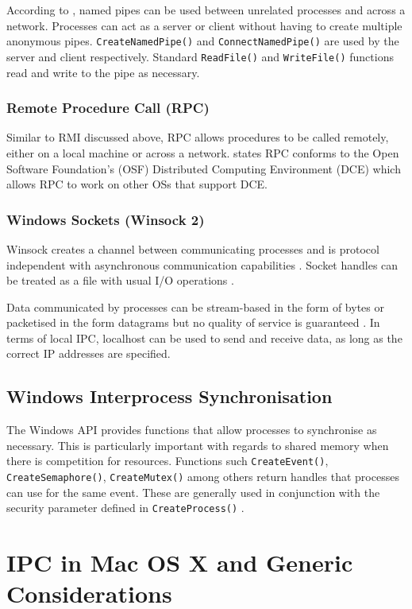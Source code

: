 \documentclass[12pt,a4paper,oneside]{article}
\def\code#1{\texttt{#1}}
\begin{document}
      According to \cite{MSDN_API}, named pipes can be used between unrelated processes and across a network. Processes can act as a server or client without having to create multiple anonymous pipes. \code{CreateNamedPipe()} and \code{ConnectNamedPipe()} are used by the server and client respectively. Standard \code{ReadFile()} and \code{WriteFile()} functions read and write to the pipe as necessary.

    \subsubsection{Remote Procedure Call (RPC)}
      Similar to RMI discussed above, RPC allows procedures to be called remotely, either on a local machine or across a network. \cite{MSDN_API} states RPC conforms to the Open Software Foundation's (OSF) Distributed Computing Environment (DCE) which allows RPC to work on other OSs that support DCE.

    \subsubsection{Windows Sockets (Winsock 2)}
      Winsock creates a channel between communicating processes and is protocol independent with asynchronous communication capabilities \citep{lewandowski1997interprocess}. Socket handles can be treated as a file with usual I/O operations \citep{MSDN_API}.

      Data communicated by processes can be stream-based in the form of bytes or packetised in the form datagrams but no quality of service is guaranteed \citep{IPCWindowsLinkedInSlides}. In terms of local IPC, localhost can be used to send and receive data, as long as the correct IP addresses are specified.

  \subsection{Windows Interprocess Synchronisation}
    The Windows API provides functions that allow processes to synchronise as necessary. This is particularly important with regards to shared memory when there is competition for resources. Functions such \code{CreateEvent()}, \code{CreateSemaphore()}, \code{CreateMutex()} among others return handles that processes can use for the same event. These are generally used in conjunction with the security parameter defined in \code{CreateProcess()} \citep{MSDN_API}.

\section{IPC in Mac OS X and Generic Considerations}
\end{document}
